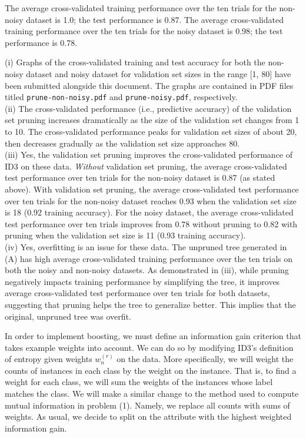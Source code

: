 \documentclass[solution, letterpaper]{cs121}
\begin{document}
\subproblem The average cross-validated training performance over the ten trials for the non-noisy dataset is 1.0; the test performance is 0.87. The average cross-validated training performance over the ten trials for the noisy dataset is 0.98; the test performance is 0.78.
\pagebreak
\subproblem
 
(i) Graphs of the cross-validated training and test accuracy for both the non-noisy dataset and noisy dataset for validation set sizes in the range [1, 80] have been submitted alongside this document. The graphs are contained in PDF files titled {\tt prune-non-noisy.pdf} and {\tt prune-noisy.pdf}, respectively. \\

(ii) The cross-validated performance (i.e., predictive accuracy) of the validation set pruning increases dramatically as the size of the validation set changes from 1 to 10. The cross-validated performance peaks for validation set sizes of about 20, then decreases gradually as the validation set size approaches 80. \\

(iii) Yes, the validation set pruning improves the cross-validated performance of ID3 on these data. \emph{Without} validation set pruning, the average cross-validated test performance over ten trials for the non-noisy dataset is 0.87 (as stated above). With validation set pruning, the average cross-validated test performance over ten trials for the non-noisy dataset reaches 0.93 when the validation set size is 18 (0.92 training accuracy). For the noisy dataset, the average cross-validated test performance over ten trials improves from 0.78 without pruning to 0.82 with pruning when the validation set size is 11 (0.93 training accuracy). \\

(iv) Yes, overfitting is an issue for these data. The unpruned tree generated in (A) has high average cross-validated training performance over the ten trials on both the noisy and non-noisy datasets. As demonstrated in (iii), while pruning negatively impacts training performance by simplifying the tree, it improves average cross-validated test performance over ten trials for both datasets, suggesting that pruning helps the tree to generalize better. This implies that the original, unpruned tree was overfit.

\subproblem In order to implement boosting, we must define an information gain criterion that takes example weights into account. We can do so by modifying ID3's definition of entropy given weights $w_n^{(r)}$ on the data. More specifically, we will weight the counts of instances in each class by the weight on the instance. That is, to find a weight for each class, we will sum the weights of the instances whose label matches the class. We will make a similar change to the method used to compute mutual information in problem (1). Namely, we replace all counts with sums of weights. As usual, we decide to split on the attribute with the highest weighted information gain.
\end{document}
